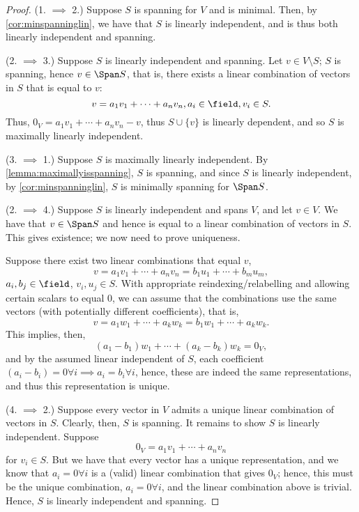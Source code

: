 \begin{proof}
    (1. $\implies$ 2.) Suppose $S$ is spanning for $V$ and is minimal. Then, by \cref{cor:minspanninglin}, we have that $S$ is linearly independent, and is thus both linearly independent and spanning.

    \noindent(2. $\implies$ 3.) Suppose $S$ is linearly independent and spanning. Let $v \in V \setminus S$; $S$ is spanning, hence $v \in \Span S$, that is, there exists a linear combination of vectors in $S$ that is equal to $v$:
    \[
    v = a_1 v_1 + \cdots + a_n v_n, a_i \in \field, v_i \in S.    
    \]
    Thus, $0_V = a_1 v_1 + \cdots + a_n v_n - v$, thus $S \cup \{v\}$ is linearly dependent, and so $S$ is maximally linearly independent.

    \noindent (3. $\implies$ 1.) Suppose $S$ is maximally linearly independent. By \cref{lemma:maximallyisspanning}, $S$ is spanning, and since $S$ is linearly independent, by \cref{cor:minspanninglin}, $S$ is minimally spanning for $\Span S$.

    \noindent (2. $\implies$ 4.) Suppose $S$ is linearly independent and spans $V$, and let $v \in V$. We have that $v \in \Span S$ and hence is equal to a linear combination of vectors in $S$. This gives existence; we now need to prove uniqueness.

    Suppose there exist two linear combinations that equal $v$,
    \[
    v = a_1 v_1 + \cdots + a_n v_n = b_1 u_1 + \cdots + b_m u_m,
    \]
    $a_i, b_j \in \field$, $v_i, u_j \in S$. With appropriate reindexing/relabelling and allowing certain scalars to equal $0$, we can assume that the combinations use the same vectors (with potentially different coefficients), that is, \[
    v = a_1 w_1 + \cdots + a_k w_k = b_1 w_1 + \cdots + a_k w_k.    
    \]
    This implies, then, 
    \[
    (a_1 - b_1) w_1 + \cdots + (a_k - b_k)w_k = 0_V,    
    \]
    and by the assumed linear independent of $S$, each coefficient $(a_i - b_i) = 0 \forall i \implies a_i = b_i \forall i$, hence, these are indeed the same representations, and thus this representation is unique.

    \noindent(4. $\implies$ 2.) Suppose every vector in $V$ admits a unique linear combination of vectors in $S$. Clearly, then, $S$ is spanning. It remains to show $S$ is linearly independent. Suppose \[
    0_V = a_1 v_1 + \cdots + a_n v_n    
    \]
    for $v_i \in S$. But we have that every vector has a unique representation, and we know that $a_i = 0 \forall i$ is a (valid) linear combination that gives $0_V$; hence, this must be the unique combination, $a_i = 0 \forall i$, and the linear combination above is trivial. Hence, $S$ is linearly independent and spanning.
\end{proof}

